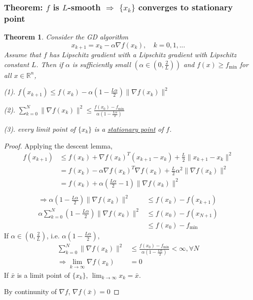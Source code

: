 \documentclass[11pt,a4paper]{article}
\newtheorem{theorem}{Theorem}
\begin{document}
\subsubsection{Theorem: $f$ is $L$-smooth $\Rightarrow$ $\{x_k\}$ converges to stationary point}
\begin{theorem}
Consider the GD algorithm $$x_{k+1}=x_k-\alpha \nabla f(x_k),\quad k=0,1,...$$
Assume that $f$ has Lipschitz gradient with a Lipschitz gradient with Lipschitz constant $L$. Then if $\alpha$ is sufficiently small $(\alpha\in(0,\frac{2}{L}))$ and $f(x)\geq f_{\min}$ for all $x\in \mathbb{R}^n$,

(1). $f(x_{k+1})\leq f(x_k)-\alpha (1-\frac{L\alpha}{2})\|\nabla f(x_k)\|^2$

(2). $\sum_{k=0}^N\|\nabla f(x_k)\|^2\leq \frac{f(x_0)-f_{\min}}{\alpha(1-\frac{L\alpha}{2})}$

(3). every limit point of $\{x_k\}$ is a \underline{stationary point} of $f$.
\end{theorem}
\begin{proof}
    Applying the descent lemma,
    \begin{equation}
        \begin{aligned}
            f(x_{k+1})&\leq f(x_k)+\nabla f(x_k)^T(x_{k+1}-x_k)+\frac{L}{2}\|x_{k+1}-x_k\|^2\\
            &=f(x_k)-\alpha\nabla f(x_k)^T \nabla f(x_k)+\frac{L}{2}\alpha^2\|\nabla f(x_k)\|^2\\
            &=f(x_k)+\alpha (\frac{L\alpha}{2}-1)\|\nabla f(x_k)\|^2\\
        \end{aligned}
        \nonumber
    \end{equation}
    \begin{equation}
        \begin{aligned}
            \Rightarrow	\alpha (1-\frac{L\alpha}{2})\|\nabla f(x_k)\|^2&\leq f(x_k)-f(x_{k+1})\\
            \alpha \sum_{k=0}^N(1-\frac{L\alpha}{2})\|\nabla f(x_k)\|^2&\leq f(x_0)-f(x_{N+1})\\
            &\leq f(x_0)-f_{\min}
        \end{aligned}
        \nonumber
    \end{equation}
    If $\alpha\in(0,\frac{2}{L})$, i.e. $\alpha(1-\frac{L\alpha}{2})$,
    \begin{equation}
        \begin{aligned}
            \sum_{k=0}^N\|\nabla f(x_k)\|^2&\leq \frac{f(x_0)-f_{\min}}{\alpha(1-\frac{L\alpha}{2})}<\infty,\forall N\\
            \Rightarrow	\lim_{k \rightarrow	\infty}\nabla f(x_k)&=0
        \end{aligned}
        \nonumber
    \end{equation}
    If $\bar{x}$ is a limit point of $\{x_k\}$, $\lim_{k \rightarrow \infty}x_k=\bar{x}$.

    By continunity of $\nabla f$, $\nabla f(\bar{x})=0$
\end{proof}
\end{document}
